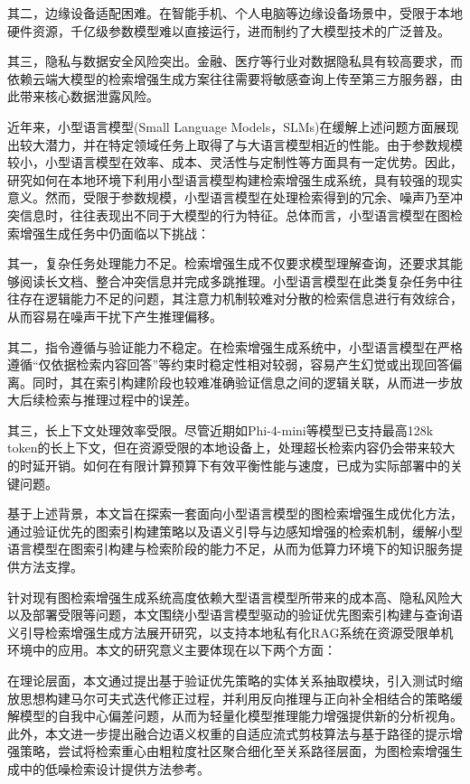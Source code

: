 \documentclass[promaster, vlined]{DissertUESTC}
\begin{document}
其二，边缘设备适配困难。在智能手机、个人电脑等边缘设备场景中，受限于本地硬件资源，千亿级参数模型难以直接运行，进而制约了大模型技术的广泛普及。

其三，隐私与数据安全风险突出。金融、医疗等行业对数据隐私具有较高要求，而依赖云端大模型的检索增强生成方案往往需要将敏感查询上传至第三方服务器，由此带来核心数据泄露风险。

近年来，小型语言模型(Small Language Models，SLMs)在缓解上述问题方面展现出较大潜力，并在特定领域任务上取得了与大语言模型相近的性能\cite{microsoft2025phi4minitechnicalreportcompact,team2025minicpm4,qwen2025qwen25technicalreport}。由于参数规模较小，小型语言模型在效率、成本、灵活性与定制性等方面具有一定优势。因此，研究如何在本地环境下利用小型语言模型构建检索增强生成系统，具有较强的现实意义。然而，受限于参数规模，小型语言模型在处理检索得到的冗余、噪声乃至冲突信息时，往往表现出不同于大模型的行为特征。总体而言，小型语言模型在图检索增强生成任务中仍面临以下挑战：

其一，复杂任务处理能力不足。检索增强生成不仅要求模型理解查询，还要求其能够阅读长文档、整合冲突信息并完成多跳推理。小型语言模型在此类复杂任务中往往存在逻辑能力不足的问题，其注意力机制较难对分散的检索信息进行有效综合，从而容易在噪声干扰下产生推理偏移。

其二，指令遵循与验证能力不稳定。在检索增强生成系统中，小型语言模型在严格遵循“仅依据检索内容回答”等约束时稳定性相对较弱，容易产生幻觉或出现回答偏离。同时，其在索引构建阶段也较难准确验证信息之间的逻辑关联，从而进一步放大后续检索与推理过程中的误差。

其三，长上下文处理效率受限。尽管近期如Phi-4-mini\cite{microsoft2025phi4minitechnicalreportcompact}等模型已支持最高128k token的长上下文，但在资源受限的本地设备上，处理超长检索内容仍会带来较大的时延开销。如何在有限计算预算下有效平衡性能与速度，已成为实际部署中的关键问题。

基于上述背景，本文旨在探索一套面向小型语言模型的图检索增强生成优化方法，通过验证优先的图索引构建策略以及语义引导与边感知增强的检索机制，缓解小型语言模型在图索引构建与检索阶段的能力不足，从而为低算力环境下的知识服务提供方法支撑。

针对现有图检索增强生成系统高度依赖大型语言模型所带来的成本高、隐私风险大以及部署受限等问题，本文围绕小型语言模型驱动的验证优先图索引构建与查询语义引导检索增强生成方法展开研究，以支持本地私有化RAG系统在资源受限单机环境中的应用。本文的研究意义主要体现在以下两个方面：

在理论层面，本文通过提出基于验证优先策略的实体关系抽取模块，引入测试时缩放思想构建马尔可夫式迭代修正过程，并利用反向推理与正向补全相结合的策略缓解模型的自我中心偏差问题，从而为轻量化模型推理能力增强提供新的分析视角。此外，本文进一步提出融合边语义权重的自适应流式剪枝算法与基于路径的提示增强策略，尝试将检索重心由粗粒度社区聚合细化至关系路径层面，为图检索增强生成中的低噪检索设计提供方法参考。
\end{document}
